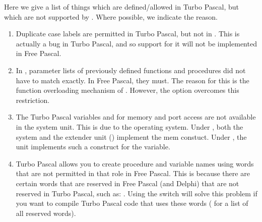 Here we give a list of things which are defined/allowed in Turbo Pascal, but
which are not supported by \fpc. Where possible, we indicate the reason.
\begin{enumerate}
\item Duplicate case labels are permitted in Turbo Pascal, but not
in \fpc. This is actually a bug in Turbo Pascal, and so
support for it will not be implemented in Free Pascal.
\item In \tp, parameter lists of previously defined functions and
procedures did not have to match exactly. In Free Pascal, they must.
The reason for this is the function overloading mechanism of
\fpc. However, the  option overcomes this restriction.
\item The Turbo Pascal variables  and  for memory and port
access are not available in the system unit. This is due to the operating system. Under
\dos, both the system and the extender unit () implement the mem constuct.
Under \linux, the  unit implements such a construct for the
 variable.
\item Turbo Pascal allows you to create procedure and variable names
using words that are not permitted in that role in Free Pascal.
This is because there are certain words that are reserved in
Free Pascal (and Delphi) that are not reserved in Turbo Pascal, such as:
.
Using the  switch will solve this problem if
you want to compile Turbo Pascal code that uses these words
( for a list of all reserved words).


\end{enumerate}
